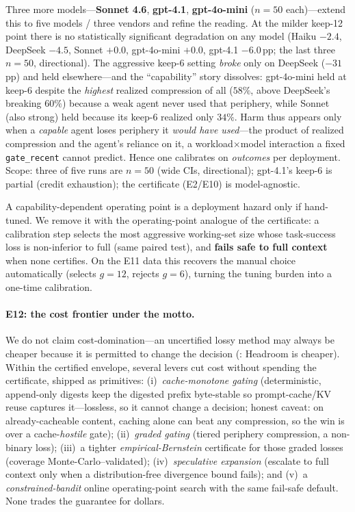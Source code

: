 \documentclass{article}
\begin{document}
Three more models---\textbf{Sonnet 4.6}, \textbf{gpt-4.1}, \textbf{gpt-4o-mini} ($n{=}50$
each)---extend this to five models / three vendors and refine the reading. At the milder
keep-12 point there is no statistically significant degradation on any model (Haiku $-2.4$,
DeepSeek $-4.5$, Sonnet $+0.0$, gpt-4o-mini $+0.0$, gpt-4.1 $-6.0$\,pp; the last three $n{=}50$,
directional). The aggressive keep-6 setting \emph{broke} only on DeepSeek ($-31$\,pp) and held
elsewhere---and the ``capability'' story dissolves: gpt-4o-mini held at keep-6 despite the
\emph{highest} realized compression of all ($58\%$, above DeepSeek's breaking $60\%$) because a
weak agent never used that periphery, while Sonnet (also strong) held because its keep-6
realized only $34\%$. Harm thus appears only when a \emph{capable} agent loses periphery it
\emph{would have used}---the product of realized compression and the agent's reliance on it, a
workload$\times$model interaction a fixed \texttt{gate\_recent} cannot predict. Hence one
calibrates on \emph{outcomes} per deployment. Scope: three of five runs are $n{=}50$ (wide CIs,
directional); gpt-4.1's keep-6 is partial (credit exhaustion); the certificate (E2/E10) is
model-agnostic.

A capability-dependent operating point is a deployment hazard only if hand-tuned. We remove it
with the operating-point analogue of the certificate: a calibration step selects the most
aggressive working-set size whose task-success loss is non-inferior to full (same paired test),
and \textbf{fails safe to full context} when none certifies. On the E11 data this recovers the
manual choice automatically (selects $g{=}12$, rejects $g{=}6$), turning the tuning burden into
a one-time calibration.

\paragraph{E12: the cost frontier under the motto.}
We do not claim cost-domination---an uncertified lossy method may always be cheaper because it
is permitted to change the decision (: Headroom is cheaper). Within the certified
envelope, several levers cut cost without spending the certificate, shipped as primitives:
(i)~\emph{cache-monotone gating} (deterministic, append-only digests keep the digested prefix
byte-stable so prompt-cache/KV reuse captures it---lossless, so it cannot change a decision;
honest caveat: on already-cacheable content, caching alone can beat any compression, so the win
is over a cache-\emph{hostile} gate); (ii)~\emph{graded gating} (tiered periphery compression,
a non-binary loss); (iii)~a tighter \emph{empirical-Bernstein} certificate for those graded
losses (coverage Monte-Carlo--validated); (iv)~\emph{speculative expansion} (escalate to full
context only when a distribution-free divergence bound fails); and (v)~a \emph{constrained-bandit}
online operating-point search with the same fail-safe default. None trades the guarantee for
dollars.
\end{document}

